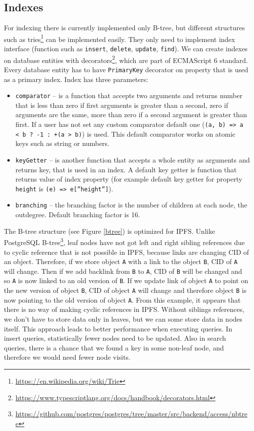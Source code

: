 \subsection{Indexes}
For indexing there is currently implemented only B-tree, but different structures such as tries\footnote{\url{https://en.wikipedia.org/wiki/Trie}} can be implemented easily. They only need to implement index interface (function such as \texttt{insert}, \texttt{delete}, \texttt{update}, \texttt{find}). We can create indexes on database entities with decorators\footnote{\url{https://www.typescriptlang.org/docs/handbook/decorators.html}}, which are part of ECMAScript 6 standard. Every database entity has to have \texttt{PrimaryKey} decorator on property that is used as a primary index. Index has three parameters:
\begin{itemize}
    \item \texttt{comparator} -- is a function that accepts two arguments and returns number that is less than zero if first arguments is greater than a second, zero if arguments are the same, more than zero if a second argument is greater than first. If a user has not set any custom comparator default one (\texttt{(a, b) =>
    a < b ? -1 : +(a > b)}) is used. This default comparator works on atomic keys such as string or numbers. 
    \item \texttt{keyGetter} -- is another function that accepts a whole entity as arguments and returns key, that is used in an index. A default key getter is function that returns value of index property (for example default key getter for property \texttt{height} is \texttt{(e) =>  e[''height'']}).
    \item \texttt{branching} -- the branching factor is the number of children at each node, the outdegree. Default branching factor is 16.
\end{itemize}

The B-tree structure (see Figure \ref{btree}) is optimized for IPFS. Unlike PostgreSQL B-tree\footnote{\url{https://github.com/postgres/postgres/tree/master/src/backend/access/nbtree}}, leaf nodes have not got left and right sibling references due to cyclic reference that is not possible in IPFS, because links are changing CID of an object. Therefore, if we store object \texttt{A} with a link to the object \texttt{B}, CID of \texttt{A} will change. Then if we add backlink from \texttt{B} to \texttt{A}, CID of \texttt{B} will be changed and so \texttt{A} is now linked to an old version of \texttt{B}. If we update link of object \texttt{A} to point on the new version of object \texttt{B}, CID of object \texttt{A} will change and therefore object \texttt{B} is now pointing to the old version of object \texttt{A}. From this example, it appears that there is no way of making cyclic references in IPFS. Without siblings references, we don't have to store data only in leaves, but we can some store data in nodes itself. This approach leads to better performance when executing queries. In insert queries, statistically fewer nodes need to be updated. Also in search queries, there is a chance that we found a key in some non-leaf node, and therefore we would need fewer node visits.

